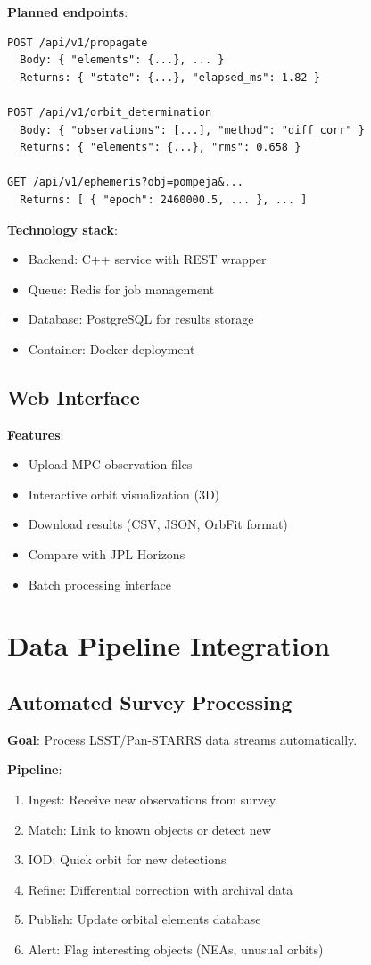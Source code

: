 \textbf{Planned endpoints}:
\begin{lstlisting}[style=output]
POST /api/v1/propagate
  Body: { "elements": {...}, ... }
  Returns: { "state": {...}, "elapsed_ms": 1.82 }

POST /api/v1/orbit_determination
  Body: { "observations": [...], "method": "diff_corr" }
  Returns: { "elements": {...}, "rms": 0.658 }

GET /api/v1/ephemeris?obj=pompeja&...
  Returns: [ { "epoch": 2460000.5, ... }, ... ]
\end{lstlisting}

\textbf{Technology stack}:
\begin{itemize}
    \item Backend: C++ service with REST wrapper
    \item Queue: Redis for job management
    \item Database: PostgreSQL for results storage
    \item Container: Docker deployment
\end{itemize}

\subsection{Web Interface}

\textbf{Features}:
\begin{itemize}
    \item Upload MPC observation files
    \item Interactive orbit visualization (3D)
    \item Download results (CSV, JSON, OrbFit format)
    \item Compare with JPL Horizons
    \item Batch processing interface
\end{itemize}

\section{Data Pipeline Integration}

\subsection{Automated Survey Processing}

\textbf{Goal}: Process LSST/Pan-STARRS data streams automatically.

\textbf{Pipeline}:
\begin{enumerate}
    \item Ingest: Receive new observations from survey
    \item Match: Link to known objects or detect new
    \item IOD: Quick orbit for new detections
    \item Refine: Differential correction with archival data
    \item Publish: Update orbital elements database
    \item Alert: Flag interesting objects (NEAs, unusual orbits)
\end{enumerate}

